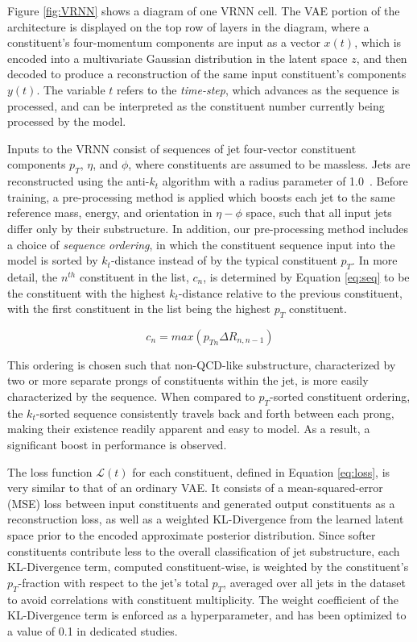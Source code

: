\documentclass[letterpaper,11pt]{article}
\begin{document}
Figure \ref{fig:VRNN} shows a diagram of one VRNN cell. The VAE portion of the architecture is displayed on the top row of layers in the diagram, where a constituent's four-momentum components are input as a vector $x(t)$, which is encoded into a multivariate Gaussian distribution in the latent space $z$, and then decoded to produce a reconstruction of the same input constituent's components $y(t)$. The variable $t$ refers to the \textit{time-step}, which advances as the sequence is processed, and can be interpreted as the constituent number currently being processed by the model. 


Inputs to the VRNN consist of sequences of jet four-vector constituent components $p_{T}$, $\eta$, and $\phi$, where constituents are assumed to be massless.
Jets are reconstructed using the anti-$k_t$ algorithm with a radius parameter of 1.0~\cite{Cacciari_2008}.
Before training, a pre-processing method is applied which boosts each jet to the same reference mass, energy, and orientation in $\eta-\phi$ space, such that all input jets differ only by their substructure.
In addition, our pre-processing method includes a choice of \textit{sequence ordering}, in which the constituent sequence input into the model is sorted by $k_{t}$-distance instead of by the typical constituent $p_{T}$. 
In more detail, the $n^{th}$ constituent in the list, $c_{n}$, is determined by Equation \ref{eq:seq} to be the constituent with the highest $k_{t}$-distance relative to the previous constituent, with the first constituent in the list being the highest $p_{T}$ constituent. 

\begin{equation}
\label{eq:seq}
c_{n} = max(p_{Tn}\Delta R_{n, n-1})
\end{equation}

This ordering is chosen such that non-QCD-like substructure, characterized by two or more separate prongs of constituents within the jet, is more easily characterized by the sequence. 
When compared to $p_{T}$-sorted constituent ordering, the $k_{t}$-sorted sequence consistently travels back and forth between each prong, making their existence readily apparent and easy to model. As a result, a significant boost in performance is observed.

The loss function $\mathcal{L}(t)$ for each constituent, defined in Equation \ref{eq:loss}, is very similar to that of an ordinary VAE. 
It consists of a mean-squared-error (MSE) loss between input constituents and generated output constituents as a reconstruction loss, as well as a weighted KL-Divergence from the learned latent space prior to the encoded approximate posterior distribution. 
Since softer constituents contribute less to the overall classification of jet substructure, each KL-Divergence term, computed constituent-wise, is weighted by the constituent's $p_{T}$-fraction with respect to the jet's total $p_{T}$, averaged over all jets in the dataset to avoid correlations with constituent multiplicity. 
The weight coefficient of the KL-Divergence term is enforced as a hyperparameter, and has been optimized to a value of 0.1 in dedicated studies. 
\end{document}
